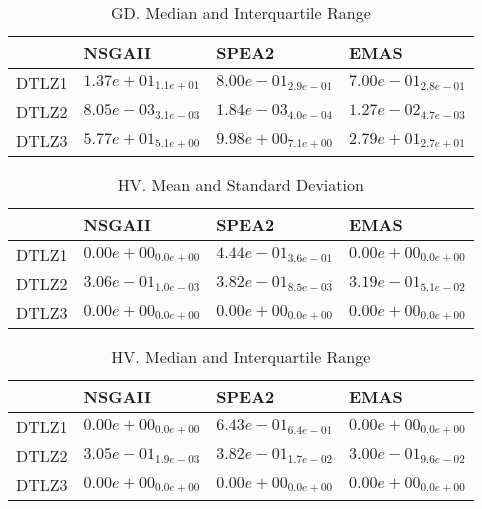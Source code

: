 \documentclass{article}
\begin{document}
\begin{table}
\caption{GD. Median and Interquartile Range}
\label{table: GD}
\centering
\begin{scriptsize}
\begin{tabular}{llll}
\hline & NSGAII & SPEA2 &  EMAS\\
\hline 
DTLZ1 & $  1.37e+01_{ 1.1e+01}$ & \cellcolor{gray25}$  8.00e-01_{ 2.9e-01}$ & \cellcolor{gray95}$  7.00e-01_{ 2.8e-01}$ \\
DTLZ2 & \cellcolor{gray25}$  8.05e-03_{ 3.1e-03}$ & \cellcolor{gray95}$  1.84e-03_{ 4.0e-04}$ & $  1.27e-02_{ 4.7e-03}$ \\
DTLZ3 & $  5.77e+01_{ 5.1e+00}$ & \cellcolor{gray95}$  9.98e+00_{ 7.1e+00}$ & \cellcolor{gray25}$  2.79e+01_{ 2.7e+01}$ \\
\hline
\end{tabular}
\end{scriptsize}
\end{table}

\begin{table}
\caption{HV. Mean and Standard Deviation}
\label{table: HV}
\centering
\begin{scriptsize}
\begin{tabular}{llll}
\hline & NSGAII & SPEA2 &  EMAS\\
\hline 
DTLZ1 & $  0.00e+00_{ 0.0e+00}$ & \cellcolor{gray95}$  4.44e-01_{ 3.6e-01}$ & $  0.00e+00_{ 0.0e+00}$ \\
DTLZ2 & $  3.06e-01_{ 1.0e-03}$ & \cellcolor{gray95}$  3.82e-01_{ 8.5e-03}$ & \cellcolor{gray25}$  3.19e-01_{ 5.1e-02}$ \\
DTLZ3 & $  0.00e+00_{ 0.0e+00}$ & $  0.00e+00_{ 0.0e+00}$ & $  0.00e+00_{ 0.0e+00}$ \\
\hline
\end{tabular}
\end{scriptsize}
\end{table}

\begin{table}
\caption{HV. Median and Interquartile Range}
\label{table: HV}
\centering
\begin{scriptsize}
\begin{tabular}{llll}
\hline & NSGAII & SPEA2 &  EMAS\\
\hline 
DTLZ1 & $  0.00e+00_{ 0.0e+00}$ & \cellcolor{gray95}$  6.43e-01_{ 6.4e-01}$ & $  0.00e+00_{ 0.0e+00}$ \\
DTLZ2 & \cellcolor{gray25}$  3.05e-01_{ 1.9e-03}$ & \cellcolor{gray95}$  3.82e-01_{ 1.7e-02}$ & $  3.00e-01_{ 9.6e-02}$ \\
DTLZ3 & $  0.00e+00_{ 0.0e+00}$ & $  0.00e+00_{ 0.0e+00}$ & $  0.00e+00_{ 0.0e+00}$ \\
\hline
\end{tabular}
\end{scriptsize}
\end{table}
\end{document}

